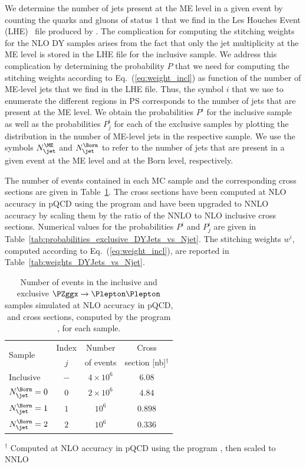 We determine the number of jets present at the ME level in a given event by counting the quarks and gluons of status $1$ 
that we find in the \textrm{Les Houches Event} (LHE)~\cite{Alwall:2006yp} file produced by \MGvATNLO.
The complication for computing the stitching weights for the NLO DY samples arises from the fact that only the jet multiplicity at the ME level is stored in the LHE file for the inclusive sample.
We address this complication by determining the probability $P$ that we need for computing the stitching weights according to Eq.~(\ref{eq:weight_incl})
as function of the number of ME-level jets that we find in the LHE file.
Thus, the symbol $i$ that we use to enumerate the different regions in PS
corresponds to the number of jets that are present at the ME level.
We obtain the probabilities $P^{i}$ for the inclusive sample as well as the probabilities $P_{j}^{i}$ for each of the exclusive samples
by plotting the distribution in the number of ME-level jets in the respective sample.
We use the symbols $N_{\jet}^{\ME}$ and $N_{\jet}^{\Born}$ to refer to the number of jets that are present in a given event
at the ME level and at the Born level, respectively.

The number of events contained in each MC sample and the corresponding cross sections are given in Table~\ref{tab:samples_DYJets_vs_Njet}.
The cross sections have been computed at NLO accuracy in pQCD using the program \MGvATNLO
and have been upgraded to NNLO accuracy by scaling them by the ratio of the NNLO to NLO inclusive cross sections.
Numerical values for the probabilities $P^{i}$ and $P_{j}^{i}$ are given in Table~\ref{tab:probabilities_exclusive_DYJets_vs_Njet}.
The stitching weights $w^{i}$, computed according to Eq.~(\ref{eq:weight_incl}), are reported in Table~\ref{tab:weights_DYJets_vs_Njet}.

\begin{table}[h!]
\begin{center}
\def\arraystretch{1.3}
\begin{tabular}{l|c|c|c}
\hline
\multirow{2}{20mm}{Sample} & Index & Number    & Cross                    \\
                           & $j$   & of events & section [nb]$^{\dagger}$ \\
\hline
\hline
Inclusive                  & $-$   & $4 \times 10^{6}$ & $6.08$ \\
\hline
$N_{\jet}^{\Born} = 0$     & $0$   & $2 \times 10^{6}$ & $4.84$ \\
$N_{\jet}^{\Born} = 1$     & $1$   & $10^{6}$ & $0.898$ \\
$N_{\jet}^{\Born} = 2$     & $2$   & $10^{6}$ & $0.336$ \\
\hline
\end{tabular}
\end{center}
$^{\dagger}$ Computed at NLO accuracy in pQCD using the program \MGvATNLO, then scaled to NNLO
\caption{
  Number of events in the inclusive and exclusive $\PZggx \to \Plepton\Plepton$ samples simulated at NLO accuracy in pQCD,
  and cross sections, computed by the program \MGvATNLO, for each sample.
}
\label{tab:samples_DYJets_vs_Njet}
\end{table}

